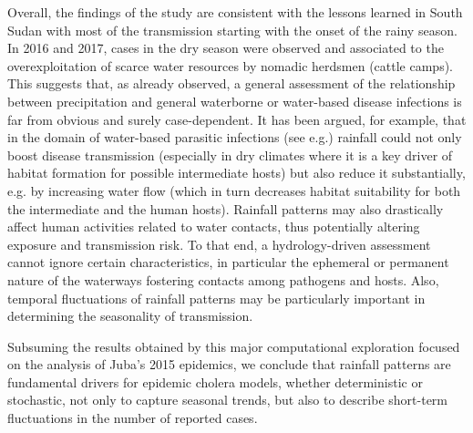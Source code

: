 Overall, the findings of the study are consistent with the lessons learned in South Sudan with most of the transmission starting with the onset of the rainy season. In 2016 and 2017, cases in the dry season were observed and associated to the overexploitation of scarce water resources by nomadic herdsmen (cattle camps). This suggests that, as already observed, a general assessment of the relationship between precipitation and general waterborne or water-based disease infections is far from obvious and surely case-dependent. It has been argued, for example, that in the domain of water-based parasitic infections (see e.g.\cite{McCreesh:ChallengesPredictingEffects:2013,Rinaldo:ModelingKeyDrivers:2017}) rainfall could not only boost disease transmission (especially in dry climates where it is a key driver of habitat formation for possible intermediate hosts) but also reduce it substantially, e.g. by increasing water flow (which in turn decreases habitat suitability for both the intermediate and the human hosts). Rainfall patterns may also drastically affect human activities related to water contacts, thus potentially altering exposure and transmission risk\cite{Lai:SpatialDistributionSchistosomiasis:2015}. To that end, a hydrology-driven assessment cannot ignore certain characteristics, in particular the ephemeral or permanent nature of the waterways fostering contacts among pathogens and hosts\cite{Perez-Saez:HydrologyDensityFeedbacks:2016}. Also, temporal fluctuations of rainfall patterns may be particularly important in determining the seasonality of transmission\cite{Bertuzzo:HydroclimatologyDualpeakAnnual:2012,Bertuzzo:PredictionSpatialEvolution:2011,McCreesh:PredictingEffectsClimate:2015,Perez-Saez:HydrologyDensityFeedbacks:2016}.


Subsuming the results obtained by this major computational exploration focused on the analysis of Juba's 2015 epidemics, we conclude that rainfall patterns are fundamental drivers for epidemic cholera models, whether deterministic or stochastic, not only to capture seasonal trends, but also to describe short-term fluctuations in the number of reported cases. 

